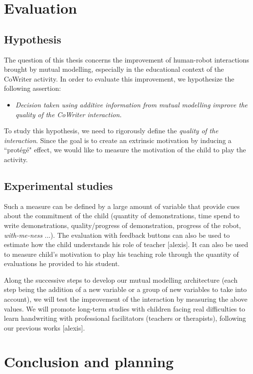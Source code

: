 \documentclass[10pt,a4paper,twocolumn]{article}
\begin{document}
\section{Evaluation}

\subsection{Hypothesis}

The question of this thesis concerns the improvement of human-robot interactions brought by mutual modelling, especially in the educational context of the CoWriter activity. In order to evaluate this improvement, we hypothesize the following assertion:
\begin{itemize}
\item \textit{Decision taken using additive information from mutual modelling improve the quality of the CoWriter interaction.}
\end{itemize}
To study this hypothesis, we need to rigorously define the \textit{quality of the interaction}. Since the goal is to create an extrinsic motivation by inducing a ``prot\'eg\'e" effect, we would like to measure the motivation of the child to play the activity.

\subsection{Experimental studies}

Such a measure can be defined by a large amount of variable that provide cues about the commitment of the child (quantity of demonstrations, time spend to write demonstrations, quality/progress of demonstration, progress of the robot, \textit{with-me-ness} ...). The evaluation with feedback buttons can also be used to estimate how the child understands his role of teacher [alexis]. It can also be used to measure child's motivation to play his teaching role through the quantity of evaluations he provided to his student. 

Along the successive steps to develop our mutual modelling architecture (each step being the addition of a new variable or a group of new variables to take into account), we will test the improvement of the interaction by measuring the above values. We will promote long-term studies with children facing real difficulties to learn handwriting with professional facilitators (teachers or therapists), following our previous works [alexis]. 

\section{Conclusion and planning}
\end{document}
